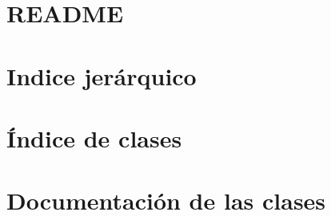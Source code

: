 \let\mypdfximage\pdfximage\def\pdfximage{\immediate\mypdfximage}\documentclass[twoside]{book}
\newcommand{\+}{\discretionary{\mbox{\scriptsize$\hookleftarrow$}}{}{}}
\newcommand{\clearemptydoublepage}{%
  \newpage{\pagestyle{empty}\cleardoublepage}%
}
\begin{document}
\chapter{R\+E\+A\+D\+ME}
\label{md__r_e_a_d_m_e}

\chapter{Indice jerárquico}

\chapter{Índice de clases}

\chapter{Documentación de las clases}












\backmatter
\newpage
{}
\clearemptydoublepage
{}
\printindex
\end{document}
